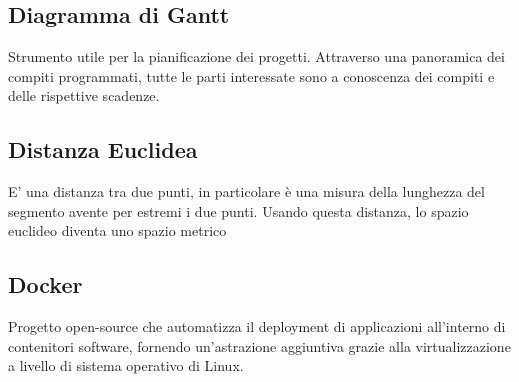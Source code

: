 \documentclass[../glossario.tex]{subfiles}
\begin{document}
\subsection*{Diagramma di Gantt}
Strumento utile per la pianificazione dei progetti. Attraverso una panoramica dei compiti programmati, tutte le parti interessate sono a conoscenza dei compiti e delle rispettive scadenze.

\subsection*{Distanza Euclidea}
E' una distanza tra due punti, in particolare è una misura della lunghezza del segmento avente per estremi i due punti. Usando questa distanza, lo spazio euclideo diventa uno spazio metrico

\subsection*{Docker}
Progetto open-source che automatizza il deployment di applicazioni all'interno di contenitori software, fornendo un'astrazione aggiuntiva grazie alla virtualizzazione a livello di sistema operativo di Linux.
\end{document}
